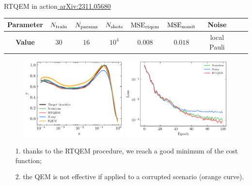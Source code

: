 \documentclass[8pt, xcolor={svgnames}, hyperref={linkcolor=black}]{beamer}
\begin{document}
\begin{frame}{RTQEM in action\hfill \href{https://arxiv.org/abs/2311.05680}{\faBook\,\,arXiv:2311.05680}}
\begin{center}
\footnotesize
\begin{tabular}{ccccccccc}
\hline \hline 
\rule{0pt}{2.5ex}
\textbf{Parameter} & $N_{\rm train}$ & $N_{\rm params}$ & $N_{\rm shots}$ 
& $\text{MSE}_{\rm rtqem}$ &  $\text{MSE}_{\rm nomit}$ & Noise \\
\hline
\rule{0pt}{2.5ex}
\textbf{Value} & $30$ & $16$ & $10^{4}$ &  $0.008$ & $0.018$ & local Pauli \\
\hline \hline 
\end{tabular}
\end{center}

\begin{figure}
    \includegraphics[width=0.485\textwidth]{figures/qpdf_sim.pdf}%
    \includegraphics[width=0.5\textwidth]{figures/qpdf_loss.pdf}
\end{figure}
\begin{itemize}[noitemsep]
\item[1.] thanks to the RTQEM procedure, we reach a good minimum of the cost function;
\item[2.] the QEM is not effective if applied to a corrupted scenario (orange curve).
\end{itemize}
\end{frame}
\end{document}

